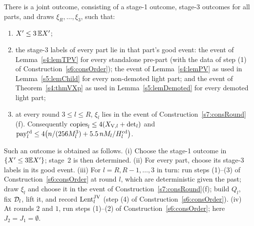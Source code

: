 \begin{lemma}\label{s7:lemOneOutcome}
There is a joint outcome, consisting of a stage-1 outcome, stage-3 outcomes for
all parts, and draws $\xi_R,\dots,\xi_3$, such that:
\begin{enumerate}
\item[(1)] $X'\le3\,\mathbb{E}X'$;
\item[(2)] the stage-3 labels of every part lie in that part's good event: the
event of Lemma~\ref{s4:lemTPV} for every standalone pre-part (with the data of
step (1) of Construction~\ref{s6:consOrder}); the event of Lemma~\ref{s4:lemPV}
as used in Lemma~\ref{s5:lemChild} for every non-demoted light part; and the event
of Theorem~\ref{s4:thmVXp} as used in Lemma~\ref{s5:lemDemoted} for every
demoted light part;
\item[(3)] at every round $3\le l\le R$, $\xi_l$ lies in the event of
Construction~\ref{s7:consRound}(f). Consequently
$\mathrm{copies}_l\le4(X_{\mathrm{V},l}+\mathrm{det}_l)$ and
$\mathrm{pay}^{\mathrm{rd}}_l\le4\bigl(n/(256M_l^3)+5.5\,nM_l/H^{\mathrm{cd}}_l\bigr)$.
\end{enumerate}
Such an outcome is obtained as follows.
(i) Choose the stage-1 outcome in $\{X'\le3\mathbb{E}X'\}$; stage~2 is then
determined.
(ii) For every part, choose its stage-3 labels in its good event.
(iii) For $l=R,R-1,\dots,3$ in turn: run steps (1)--(3) of
Construction~\ref{s6:consOrder} at round $l$, which are deterministic given the
past; draw $\xi_l$ and choose it in the event of
Construction~\ref{s7:consRound}(f); build $Q_l$, fix $\mathcal{D}_l$, lift it, and record
$\mathrm{Lent}^{\mathrm{JV}}_l$ (step (4) of Construction~\ref{s6:consOrder}).
(iv) At rounds $2$ and $1$, run steps (1)--(2) of Construction~\ref{s6:consOrder};
here $J_2=J_1=\emptyset$.
\deps{\ref{s7:defSchedule}, \ref{s7:consRound}, \ref{s6:consOrder}, \ref{s4:lemTPV}, \ref{s4:lemPV}, \ref{s4:thmVXp}, \ref{s5:lemChild}, \ref{s5:lemDemoted}, \ref{s7:lemEXprime}, \ref{s7:lemPay}, \ref{s7:lemUHsplit}, \ref{s1:citMarkov}, \ref{s1:condG3}}
\end{lemma}


